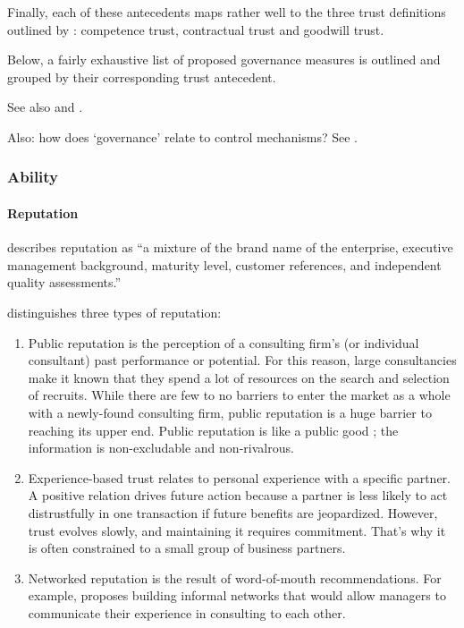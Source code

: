 \documentclass[12pt]{article}
\providecommand{\tightlist}{%
  \setlength{\itemsep}{0pt}\setlength{\parskip}{0pt}}
\begin{document}
Finally, each of these antecedents maps rather well to the three trust
definitions outlined by \citet[37-40]{sako1992}: competence trust,
contractual trust and goodwill trust.

Below, a fairly exhaustive list of proposed governance measures is
outlined and grouped by their corresponding trust antecedent.

See also \citet{lewicki2006} and \citet{kirilov2012}.

Also: how does `governance' relate to control mechanisms? See
\citet{smith2003}.

\hypertarget{ability}{%
\subsubsection{Ability}\label{ability}}

\hypertarget{reputation}{%
\paragraph{Reputation}\label{reputation}}

\citet[193]{kirilov2012} describes reputation as ``a mixture of the
brand name of the enterprise, executive management background, maturity
level, customer references, and independent quality assessments.''

\citet[75-76]{armbruster2006} distinguishes three types of reputation:

\begin{enumerate}
\def\labelenumi{\arabic{enumi}.}
\tightlist
\item
  Public reputation is the perception of a consulting firm's (or
  individual consultant) past performance or potential. For this reason,
  large consultancies make it known that they spend a lot of resources
  on the search and selection of recruits. \citep[ 91]{kieser2006} While
  there are few to no barriers to enter the market as a whole with a
  newly-found consulting firm, public reputation is a huge barrier to
  reaching its upper end. Public reputation is like a public good ; the
  information is non-excludable and non-rivalrous.
\item
  Experience-based trust relates to personal experience with a specific
  partner. A positive relation drives future action because a partner is
  less likely to act distrustfully in one transaction if future benefits
  are jeopardized. \citep[ 367]{shapiro1992} However, trust evolves
  slowly, and maintaining it requires commitment. That's why it is often
  constrained to a small group of business partners.
\item
  Networked reputation is the result of word-of-mouth recommendations.
  For example, \citet[308]{honer2006} proposes building informal
  networks that would allow managers to communicate their experience in
  consulting to each other.
\end{enumerate}
\end{document}
